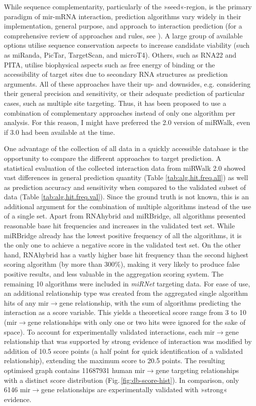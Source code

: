 While sequence complementarity, particularly of the »seed«-region, is the primary paradigm of \ac{mir}-mRNA interaction, prediction algorithms vary widely in their implementation, general purpose, and approach to interaction prediction (for a comprehensive review of approaches and rules, see \cite{Yue2009}). A large group of available options utilise sequence conservation aspects to increase candidate viability (such as miRanda, PicTar, TargetScan, and microT4). Others, such as RNA22 and PITA, utilise biophysical aspects such as free energy of binding or the accessibility of target sites due to secondary RNA structures as prediction arguments. All of these approaches have their up- and downsides, e.g. considering their general precision and sensitivity, or their adequate prediction of particular cases, such as multiple site targeting. Thus, it has been proposed to use a combination of complementary approaches instead of only one algorithm per analysis\cite{Witkos2011}. For this reason, I might have preferred the 2.0 version of miRWalk, even if 3.0 had been available at the time.

One advantage of the collection of all data in a quickly accessible database is the opportunity to compare the different approaches to target prediction. A statistical evaluation of the collected interaction data from miRWalk 2.0 showed vast differences in general prediction quantity (Table \ref{tab:alg.hit.freq.all}) as well as prediction accuracy and sensitivity when compared to the validated subset of data (Table \ref{tab:alg.hit.freq.val}). Since the ground truth is not known, this is an additional argument for the combination of multiple algorithms instead of the use of a single set. Apart from RNAhybrid and miRBridge, all algorithms presented reasonable base hit frequencies and increases in the validated test set. While miRBridge already has the lowest positive frequency of all the algorithms, it is the only one to achieve a negative score in the validated test set. On the other hand, RNAhybrid has a vastly higher base hit frequency than the second highest scoring algorithm (by more than \num{300}\%), making it very likely to produce false positive results, and less valuable in the aggregation scoring system. The remaining 10 algorithms were included in \textit{miRNet} targeting data. For ease of use, an additional relationship type was created from the aggregated single algorithm hits of any \ac{mir}$\to$gene relationship, with the sum of algorithms predicting the interaction as a score variable. This yields a theoretical score range from \num{3} to \num{10} (\ac{mir}$\to$gene relationships with only one or two hits were ignored for the sake of space). To account for experimentally validated interactions, each \ac{mir}$\to$gene relationship that was supported by strong evidence of interaction was modified by addition of \num{10.5} score points (a half point for quick identification of a validated relationship), extending the maximum score to \num{20.5} points. The resulting optimised graph contains \num{11687931} human \ac{mir}$\to$gene targeting relationships with a distinct score distribution (Fig.\,\ref{fig:db-score-hist}). In comparison, only 6146 \ac{mir}$\to$gene relationships are experimentally validated with »strong« evidence.

